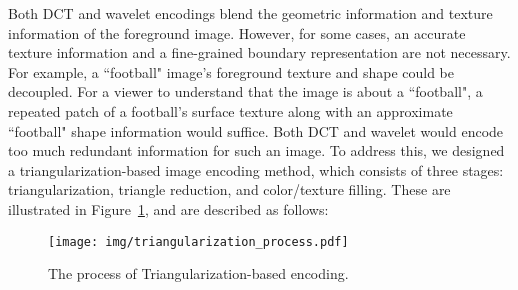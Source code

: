 Both DCT and wavelet encodings blend the geometric information and texture information of the foreground image. However, for some cases, an accurate texture information and a fine-grained boundary representation are not necessary. For example, a ``football" image's foreground texture and shape could be decoupled. For a viewer to understand that the image is about a ``football", a repeated patch of a football's surface texture along with an approximate ``football" shape information would suffice. Both DCT and wavelet would encode too much redundant information for such an image. To address this, we designed a triangularization-based image encoding method, which consists of three stages: triangularization, triangle reduction, and color/texture filling. These are illustrated in Figure~\ref{fig:tri}, and are described as follows:

\begin{figure}[!thb]
    \begin{center}
	    \texttt{[image: img/triangularization\_process.pdf]}
	    \caption{\footnotesize The process of Triangularization-based encoding.}
	    \label{fig:tri}
    \end{center}
\end{figure}

	\vspace{.5em}

	\vspace{.5em}

